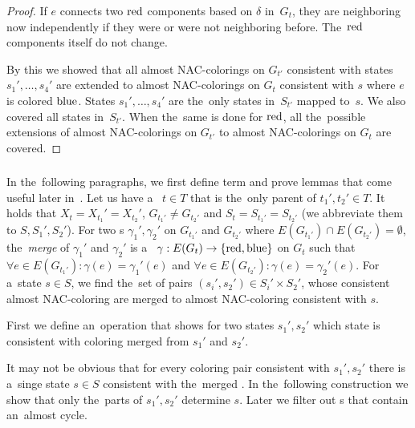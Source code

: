 \begin{proof}
	If \( e \) connects two \( \text{red} \) components based on \( \delta \) in~\( G_t \),
	they are neighboring now independently if they were or were not neighboring before.
	The~\( \text{red} \) components itself do not change.

	By this we showed that all almost NAC-colorings on \( G_{t'} \) consistent with
	states \( s_1', \dots, s_4' \) are extended to almost NAC-colorings on \( G_t \)
	consistent with \( s \) where \( e \) is colored \( \text{blue} \).
	States \( s_1', \dots, s_4' \) are the~only states in~\( S_{t'} \) mapped to~\( s \).
	We also covered all states in~\( S_{t'} \).
	When the~same is done for \( \text{red} \), all the~possible extensions
	of almost NAC-colorings on \( G_{t'} \) to almost NAC-colorings on \( G_t \)
	are covered.
\end{proof}

\subsubsection*{\JoinNode{}}

In the~following paragraphs,
we first define term and prove lemmas
that come useful later in~.
%
Let us have a~\JoinNode{} \( t \in T \) that is
the~only parent of \( t_1', t_2' \in T \).
It holds that \( X_t = X_{t_1}' = X_{t_2}' \),
\( G_{t_1'} \ne G_{t_2'} \)
and \( S_t = S_{t_1'} = S_{t_2'} \)
(we abbreviate them to \( S, S_1', S_2' \)).
%
For two \rbcol{}s \( \gamma_1', \gamma_2' \)
on \( G_{t_1'} \) and \( G_{t_2'} \)
where \( E(G_{t_1'}) \cap E(G_{t_2'}) = \emptyset \),
the~\emph{merge} of \( \gamma_1' \) and \( \gamma_2' \)
is a~\rbcol{} \( \gamma : E(G_t) \to \{ \text{red}, \text{blue} \} \) on \( G_t \)
such that \( \forall e \in E(G_{t_1'}) : \gamma(e) = \gamma_1'(e) \) and
\( \forall e \in E(G_{t_2'}) : \gamma(e) = \gamma_2'(e) \).
%
For a~state \( s \in S \), we find the~set of
pairs \( (s_i', s_2') \in S_i' \times S_2' \),
whose consistent almost NAC-coloring are merged
to almost NAC-coloring consistent with \( s \).

First we define an~operation that shows for two states \( s_1', s_2' \)
which state is consistent with coloring merged from \( s_1' \) and \( s_2' \).
%
%
It may not be obvious that for every coloring pair consistent with \( s_1', s_2' \)
there is a~singe state \( s \in S \) consistent with the~merged \rbcol{}.
In the~following construction we show that
only the~parts of \( s_1', s_2' \) determine \( s \).
Later we filter out \rbcol{}s that contain an~almost cycle.

